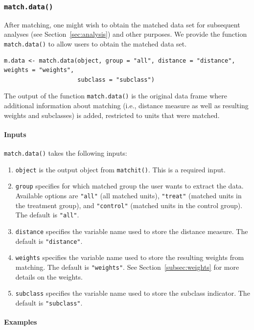 \documentclass[oneside,letterpaper,titlepage]{article}
\begin{document}
\subsubsection{{\tt match.data()}}
\label{subsec:match.data}

After matching, one might wish to obtain the matched data set for
subsequent analyses (see Section~\ref{sec:analysis}) and other
purposes. We provide the function {\tt match.data()} to allow users to
obtain the matched data set.
\begin{verbatim}
m.data <- match.data(object, group = "all", distance = "distance", weights = "weights",
                     subclass = "subclass")
\end{verbatim}
The output of the function {\tt match.data()} is the original data
frame where additional information about matching (i.e., distance
measure as well as resulting weights and subclasses) is added,
restricted to units that were matched.

\paragraph{Inputs}

{\tt match.data()} takes the following inputs:
\begin{enumerate}
\item {\tt object} is the output object from {\tt matchit()}. This is
  a required input.
\item {\tt group} specifies for which matched group the user wants to
  extract the data. Available options are {\tt "all"} (all matched
  units), {\tt "treat"} (matched units in the treatment group), and
  {\tt "control"} (matched units in the control group). The default is
  {\tt "all"}.
\item {\tt distance} specifies the variable name used to store the
  distance measure. The default is {\tt "distance"}.
\item {\tt weights} specifies the variable name used to store the
  resulting weights from matching. The default is {\tt "weights"}. See
  Section~\ref{subsec:weights} for more details on the weights.
\item {\tt subclass} specifies the variable name used to store the
  subclass indicator. The default is {\tt "subclass"}.
\end{enumerate}

\paragraph{Examples}
\end{document}
